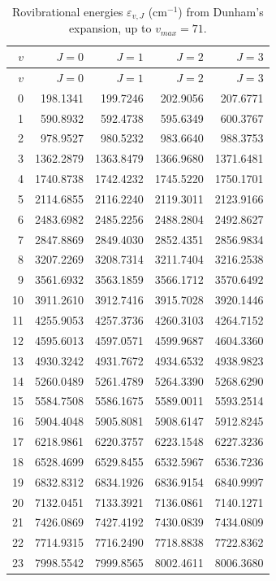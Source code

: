 \documentclass[11pt]{article}
\begin{document}
\begin{longtable}{r r r r r }
\caption{Rovibrational energies $\varepsilon_{v,J}$ (cm$^{-1}$) from Dunham's expansion, up to $v_{max}=71$.}\\
\toprule $v$ & $J=0$ & $J=1$ & $J=2$ & $J=3$ \\\midrule\endfirsthead
\toprule $v$ & $J=0$ & $J=1$ & $J=2$ & $J=3$ \\\midrule\endhead
0 & 198.1341 & 199.7246 & 202.9056 & 207.6771 \\
1 & 590.8932 & 592.4738 & 595.6349 & 600.3767 \\
2 & 978.9527 & 980.5232 & 983.6640 & 988.3753 \\
3 & 1362.2879 & 1363.8479 & 1366.9680 & 1371.6481 \\
4 & 1740.8738 & 1742.4232 & 1745.5220 & 1750.1701 \\
5 & 2114.6855 & 2116.2240 & 2119.3011 & 2123.9166 \\
6 & 2483.6982 & 2485.2256 & 2488.2804 & 2492.8627 \\
7 & 2847.8869 & 2849.4030 & 2852.4351 & 2856.9834 \\
8 & 3207.2269 & 3208.7314 & 3211.7404 & 3216.2538 \\
9 & 3561.6932 & 3563.1859 & 3566.1712 & 3570.6492 \\
10 & 3911.2610 & 3912.7416 & 3915.7028 & 3920.1446 \\
11 & 4255.9053 & 4257.3736 & 4260.3103 & 4264.7152 \\
12 & 4595.6013 & 4597.0571 & 4599.9687 & 4604.3360 \\
13 & 4930.3242 & 4931.7672 & 4934.6532 & 4938.9823 \\
14 & 5260.0489 & 5261.4789 & 5264.3390 & 5268.6290 \\
15 & 5584.7508 & 5586.1675 & 5589.0011 & 5593.2514 \\
16 & 5904.4048 & 5905.8081 & 5908.6147 & 5912.8245 \\
17 & 6218.9861 & 6220.3757 & 6223.1548 & 6227.3236 \\
18 & 6528.4699 & 6529.8455 & 6532.5967 & 6536.7236 \\
19 & 6832.8312 & 6834.1926 & 6836.9154 & 6840.9997 \\
20 & 7132.0451 & 7133.3921 & 7136.0861 & 7140.1271 \\
21 & 7426.0869 & 7427.4192 & 7430.0839 & 7434.0809 \\
22 & 7714.9315 & 7716.2490 & 7718.8838 & 7722.8362 \\
23 & 7998.5542 & 7999.8565 & 8002.4611 & 8006.3680 \\

\end{longtable}
\end{document}
